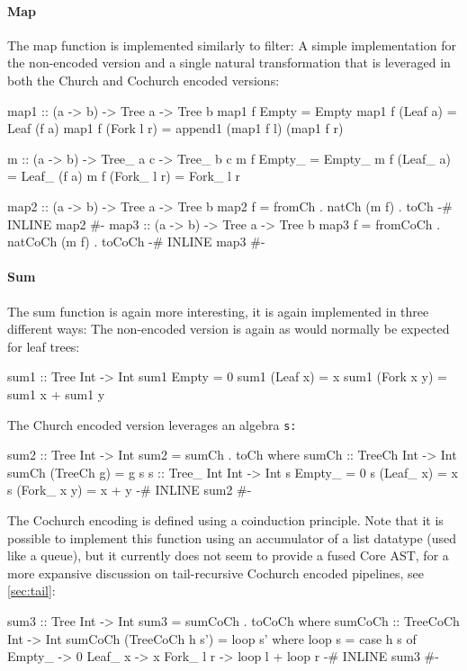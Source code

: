 \paragraph{Map} The map function is implemented similarly to filter: A simple implementation for the non-encoded version and a single natural transformation that is leveraged in both the Church and Cochurch encoded versions:
\begin{code}
map1 :: (a -> b) -> Tree a -> Tree b
map1 f Empty = Empty
map1 f (Leaf a) = Leaf (f a)
map1 f (Fork l r) = append1 (map1 f l) (map1 f r)

m :: (a -> b) -> Tree_ a c -> Tree_ b c
m f Empty_ = Empty_
m f (Leaf_ a) = Leaf_ (f a)
m f (Fork_ l r) = Fork_ l r

map2 :: (a -> b) -> Tree a -> Tree b
map2 f = fromCh . natCh (m f) . toCh
{-# INLINE map2 #-}
map3 :: (a -> b) -> Tree a -> Tree b
map3 f = fromCoCh . natCoCh (m f) . toCoCh
{-# INLINE map3 #-}
\end{code}
\paragraph{Sum} The sum function is again more interesting, it is again implemented in three different ways:
The non-encoded version is again as would normally be expected for leaf trees:
\begin{code}
sum1 :: Tree Int -> Int
sum1 Empty = 0
sum1 (Leaf x) = x
sum1 (Fork x y) = sum1 x + sum1 y
\end{code}
The Church encoded version leverages an algebra \tt{s}:
\begin{code}
sum2 :: Tree Int -> Int
sum2 = sumCh . toCh
  where sumCh :: TreeCh Int -> Int
        sumCh (TreeCh g) = g s
        s :: Tree_ Int Int -> Int
        s Empty_ = 0
        s (Leaf_ x) = x
        s (Fork_ x y) = x + y
{-# INLINE sum2 #-}
\end{code}
The Cochurch encoding is defined using a coinduction principle.
Note that it is possible to implement this function using an accumulator of a list datatype (used like a queue), but it currently does not seem to provide a fused Core AST, for a more expansive discussion on tail-recursive Cochurch encoded pipelines, see \autoref{sec:tail}:
\begin{code}
sum3 :: Tree Int -> Int
sum3 = sumCoCh . toCoCh
  where sumCoCh :: TreeCoCh Int -> Int
        sumCoCh (TreeCoCh h s') = loop s'
          where loop s = case h s of
                  Empty_ -> 0
                  Leaf_ x -> x
                  Fork_ l r -> loop l + loop r
{-# INLINE sum3 #-}
\end{code}
